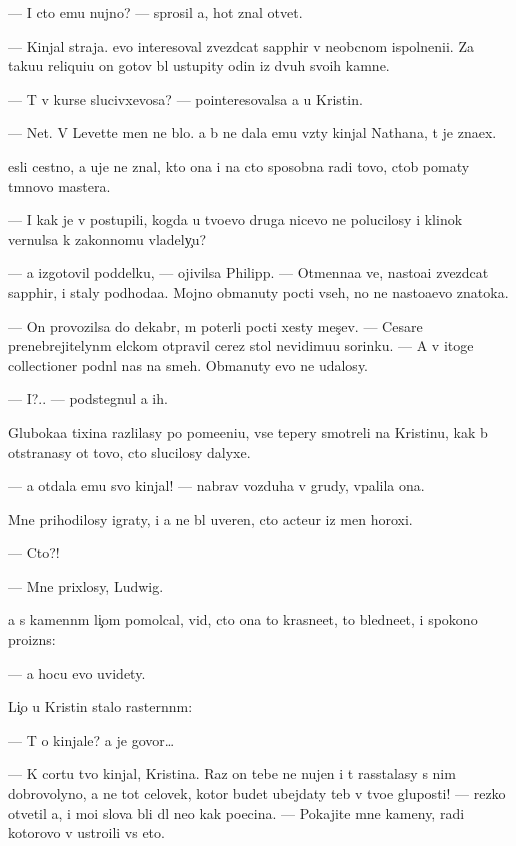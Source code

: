 \documentclass[10pt]{book}
\begin{document}
— I cto {\y}emu nujno? — sprosil {\y}a, hot{\ia} znal otvet.

— Kinjal straja. {\Y}evo interesoval zvezdcat{\yi}{\y} sapphir v neob{\yi}cnom ispolneni{\y}i. Za taku{\y}u reliqui{\y}u on gotov b{\yi}l ustupity odin iz dvuh svo{\y}ih kamne{\y}.

— T{\yi} v kurse slucivxevosa? — pointeresovalsa {\y}a u Kristin{\yi}.

— Net. V Levette men{\ia} ne b{\yi}lo. {\Y}a b{\yi} ne dala {\y}emu vz{\ia}ty kinjal Nathana, t{\yi} je zna{\y}ex.

{\Y}esli cestno, {\y}a uje ne znal, kto ona i na cto sposobna radi tovo, ctob{\yi} po{\y}maty t{\e}mnovo mastera.

— I kak je v{\yi} postupili, kogda u tvo{\y}evo druga nicevo ne polucilosy i klinok vernulsa k zakonnomu vladely{\c}u?

— {\Y}a izgotovil poddelku, — ojivilsa Philipp. — Otmenna{\y}a ve{\x}, nasto{\y}a{\x}i{\y} zvezdcat{\yi}{\y} sapphir, i staly podhod{\ia}{\x}a{\y}a. Mojno obmanuty pocti vseh, no ne nasto{\y}a{\x}evo znatoka.

— On provozilsa do dekabr{\ia}, m{\yi} poter{\ia}li pocti xesty mes{\ia}{\c}ev. — Cesare prenebrejitelyn{\yi}m {\x}elckom otpravil cerez stol nevidimu{\y}u sorinku. — A v itoge collectioner podn{\ia}l nas na smeh. Obmanuty {\y}evo ne udalosy.

— I?.. — podstegnul {\y}a ih.

Gluboka{\y}a tixina razlilasy po pome{\x}eni{\y}u, vse tepery smotreli na Kristinu, kak b{\yi} otstran{\ia}{\y}asy ot tovo, cto slucilosy dalyxe.

— {\Y}a otdala {\y}emu svo{\y} kinjal! — nabrav vozduha v grudy, v{\yi}palila ona.

Mne prihodilosy igraty, i {\y}a ne b{\yi}l uveren, cto acteur iz men{\ia} horoxi{\y}.

— Cto?!

— Mne prixlosy, Ludwig.

{\Y}a s kamenn{\yi}m li{\c}om pomolcal, vid{\ia}, cto ona to krasne{\y}et, to bledne{\y}et, i spoko{\y}no proizn{\e}s:

— {\Y}a hocu {\y}evo uvidety.

Li{\c}o u Kristin{\yi} stalo raster{\ia}nn{\yi}m:

— T{\yi} o kinjale? {\Y}a je govor{\io}…

— K cortu tvo{\y} kinjal, Kristina. Raz on tebe ne nujen i t{\yi} rasstalasy s nim dobrovolyno, {\y}a ne tot celovek, kotor{\yi}{\y} budet ubejdaty teb{\ia} v tvo{\y}e{\y} gluposti! — rezko otvetil {\y}a, i mo{\y}i slova b{\yi}li dl{\ia} ne{\y}o kak po{\x}ecina. — Pokajite mne kameny, radi kotorovo v{\yi} ustro{\y}ili vs{\e} eto.
\end{document}
